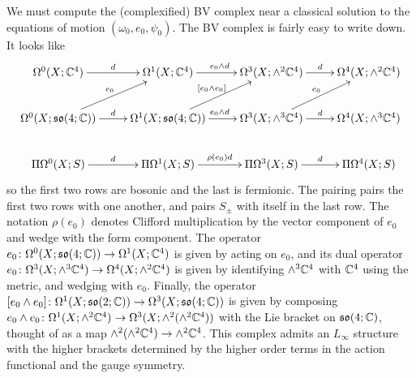 \documentclass[10pt, oneside]{article}
\begin{document}
We must compute the (complexified) BV complex near a classical solution to the equations of motion $(\omega_0, e_0, \psi_0)$.  The BV complex is fairly easy to write down.  It looks like
\[\xymatrix{
   \Omega^0(X; \CC^4) \ar[r]^d & \Omega^1(X; \CC^4) \ar[r]^{e_0 \wedge d} &\Omega^3(X; \wedge^2 \CC^4) \ar[r]^d &\Omega^4(X; \wedge^2 \CC^4) \\
   \Omega^0(X; \so(4;\CC)) \ar[r]^d \ar[ur]^{e_0} & \Omega^1(X; \so(4;\CC)) \ar[r]^{e_0 \wedge d} \ar[ur]^{[e_0 \wedge e_0]} &\Omega^3(X; \wedge^3 \CC^4) \ar[r]^d \ar[ur]^{e_0} &\Omega^4(X; \wedge^3 \CC^4) \\
   \Pi\Omega^0(X; S) \ar[r]^d & \Pi\Omega^1(X; S) \ar[r]^{\rho(e_0) d} &\Pi\Omega^3(X; S) \ar[r]^d &\Pi\Omega^4(X; S) \\
}\]
so the first two rows are bosonic and the last is fermionic.  The pairing pairs the first two rows with one another, and pairs $S_\pm$ with itself in the last row.  The notation $\rho(e_0)$ denotes Clifford multiplication by the vector component of $e_0$ and wedge with the form component.  The operator $e_0 \colon \Omega^0(X;\mathfrak{so}(4;\mathbb{C})) \to \Omega^1(X;\mathbb{C}^4)$ is given by acting on $e_0$, and its dual operator $e_0 \colon \Omega^3(X;\wedge^3\mathbb{C}^4) \to \Omega^4(X;\wedge^2\mathbb{C}^4)$ is given by identifying $\wedge^3\mathbb{C}^4$ with $\mathbb{C}^4$ using the metric, and wedging with $e_0$.  Finally, the operator $[e_0 \wedge e_0] \colon \Omega^1(X;\mathfrak{so}(2;\mathbb{C})) \to \Omega^3(X; \mathfrak{so}(4;\mathbb{C}))$ is given by composing $e_0 \wedge e_0 \colon \Omega^1(X;\wedge^2\mathbb{C}^4) \to \Omega^3(X; \wedge^2(\wedge^2 \mathbb{C}^4))$ with the Lie bracket on $\mathfrak{so}(4;\mathbb{C})$, thought of as a map $\wedge^2(\wedge^2 \mathbb{C}^4) \to \wedge^2\mathbb{C}^4$.  This complex admits an $L_\infty$ structure with the higher brackets determined by the higher order terms in the action functional and the gauge symmetry.
\end{document}
